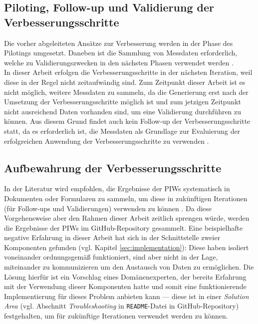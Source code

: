 \subsection{Piloting, Follow-up und Validierung der Verbesserungsschritte}
Die vorher abgeleiteten Ansätze zur Verbesserung werden in der Phase des Pilotings umgesetzt. Daneben ist die Sammlung von Messdaten erforderlich, welche zu Validierungszwecken in den nächsten Phasen verwendet werden \cite{salo2007iterative}. \\ In dieser Arbeit erfolgen die Verbesserungsschritte in der nächsten Iteration, weil diese in der Regel nicht zeitaufwändig sind. Zum Zeitpunkt dieser Arbeit ist es nicht möglich, weitere Messdaten zu sammeln, da die Generierung erst nach der Umsetzung der Verbesserungsschritte möglich ist und zum jetzigen Zeitpunkt nicht ausreichend Daten vorhanden sind, um eine Validierung durchführen zu können. Aus diesem Grund findet auch kein Follow-up der Verbesserungsschritte statt, da es erforderlich ist, die Messdaten als Grundlage zur Evaluierung der erfolgreichen Anwendung der Verbesserungsschritte zu verwenden \cite{salo2007iterative}. 

\subsection{Aufbewahrung der Verbesserungsschritte}
In der Literatur wird empfohlen, die Ergebnisse der PIWs systematisch in Dokumenten oder Formularen zu sammeln, um diese in zukünftigen Iterationen (für Follow-ups und Validierungen) verwenden zu können \cite{salo2007iterative}. Da diese Vorgehensweise aber den Rahmen dieser Arbeit zeitlich sprengen würde, werden die Ergebnisse der PIWs im GitHub-Repository gesammelt. Eine beispielhafte negative Erfahrung in dieser Arbeit hat sich in der Schnittstelle zweier Komponenten gefunden (vgl. Kapitel \ref{sec:implementation}): Diese haben isoliert voneinander ordnungsgemäß funktioniert, sind aber nicht in der Lage, miteinander zu kommunizieren um den Austausch von Daten zu ermöglichen. Die Lösung hierfür ist ein Vorschlag eines Domänenexperten, der bereits Erfahrung mit der Verwendung dieser Komponenten hatte und somit eine funktionierende Implementierung für dieses Problem anbieten kann --- diese ist in einer \textit{Solution Area} (vgl. Abschnitt \textit{Troubleshooting} in \texttt{README}-Datei in GitHub-Repository) festgehalten, um für zukünftige Iterationen verwendet werden zu können.